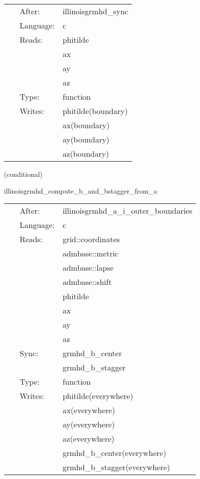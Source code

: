  \begin{tabular*}{160mm}{cll} 
~ & After:  & illinoisgrmhd\_sync \\ 
~ & Language:  & c \\ 
~ & Reads:  & phitilde \\ 
~& ~ &ax\\ 
~& ~ &ay\\ 
~& ~ &az\\ 
~ & Type:  & function \\ 
~ & Writes:  & phitilde(boundary) \\ 
~& ~ &ax(boundary)\\ 
~& ~ &ay(boundary)\\ 
~& ~ &az(boundary)\\ 
\end{tabular*} 


\vspace{5mm}

   (conditional) 

\hspace{5mm} illinoisgrmhd\_compute\_b\_and\_bstagger\_from\_a 

\hspace{5mm}{\it compute b and b\_stagger from a sync: grmhd\_primitives\_bi,grmhd\_primitives\_bi\_stagger } 


\hspace{5mm}

 \begin{tabular*}{160mm}{cll} 
~ & After:  & illinoisgrmhd\_a\_i\_outer\_boundaries \\ 
~ & Language:  & c \\ 
~ & Reads:  & grid::coordinates \\ 
~& ~ &admbase::metric\\ 
~& ~ &admbase::lapse\\ 
~& ~ &admbase::shift\\ 
~& ~ &phitilde\\ 
~& ~ &ax\\ 
~& ~ &ay\\ 
~& ~ &az\\ 
~ & Sync:  & grmhd\_b\_center \\ 
~& ~ &grmhd\_b\_stagger\\ 
~ & Type:  & function \\ 
~ & Writes:  & phitilde(everywhere) \\ 
~& ~ &ax(everywhere)\\ 
~& ~ &ay(everywhere)\\ 
~& ~ &az(everywhere)\\ 
~& ~ &grmhd\_b\_center(everywhere)\\ 
~& ~ &grmhd\_b\_stagger(everywhere)\\ 
\end{tabular*} 


